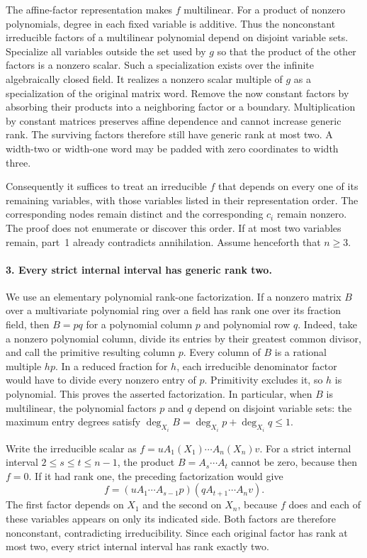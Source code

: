 The affine-factor representation makes $f$ multilinear. For a
product of nonzero polynomials, degree in each fixed variable is
additive. Thus the nonconstant irreducible factors of a multilinear
polynomial depend on disjoint variable sets. Specialize all
variables outside the set used by $g$ so that the product of the
other factors is a nonzero scalar. Such a specialization exists
over the infinite algebraically closed field. It realizes a
nonzero scalar multiple of $g$ as a specialization of the original
matrix word. Remove the now constant factors by absorbing their
products into a neighboring factor or a boundary. Multiplication
by constant matrices preserves affine dependence and cannot
increase generic rank. The surviving factors therefore still
have generic rank at most two. A width-two or width-one word may
be padded with zero coordinates to width three.

Consequently it suffices to treat an irreducible $f$ that depends
on every one of its remaining variables, with those variables
listed in their representation order. The corresponding nodes
remain distinct and the corresponding $c_i$ remain nonzero.
The proof does not enumerate or discover this order. If at most
two variables remain, part~1 already contradicts annihilation.
Assume henceforth that $n\ge3$.

\paragraph{3. Every strict internal interval has generic rank two.}
We use an elementary polynomial rank-one factorization. If a
nonzero matrix $B$ over a multivariate polynomial ring over a
field has rank one over its fraction field, then $B=pq$ for a
polynomial column $p$ and polynomial row $q$. Indeed, take a
nonzero polynomial column, divide its entries by their greatest
common divisor, and call the primitive resulting column $p$.
Every column of $B$ is a rational multiple $h p$. In a reduced
fraction for $h$, each irreducible denominator factor would have
to divide every nonzero entry of $p$. Primitivity excludes it,
so $h$ is polynomial. This proves the asserted factorization.
In particular, when $B$ is multilinear, the polynomial factors
$p$ and $q$ depend on disjoint variable sets: the maximum entry
degrees satisfy
$\deg_{X_i}B=\deg_{X_i}p+\deg_{X_i}q\le1$.

Write the irreducible scalar as
$f=u A_1(X_1)\cdots A_n(X_n)v$. For a strict internal interval
$2\le s\le t\le n-1$, the product $B=A_s\cdots A_t$ cannot
be zero, because then $f=0$. If it had rank one, the preceding
factorization would give
\[
 f=(uA_1\cdots A_{s-1}p)(qA_{t+1}\cdots A_nv).
 \tag{I.94}
\]
The first factor depends on $X_1$ and the second on $X_n$,
because $f$ does and each of these variables appears on only
its indicated side. Both factors are therefore nonconstant,
contradicting irreducibility. Since each original factor has
rank at most two, every strict internal interval has rank
exactly two.


